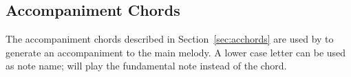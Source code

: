 \documentclass[a4paper,fullpage,12pt]{book}
\begin{document}











\subsection{Accompaniment Chords}
\label{sec:midichords}

The accompaniment chords described in Section~\ref{sec:acchords} are used
by \abcmid{} to generate an accompaniment to the main melody. A lower case
letter  can be used as note name; \abcmid{} will
play the fundamental note instead of the chord.
\end{document}
